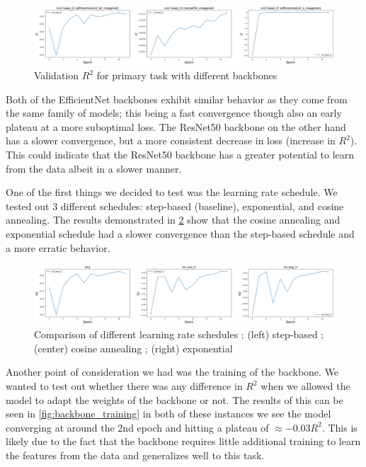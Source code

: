 \documentclass[12pt,a4paper,oneside]{article}
\begin{document}
\begin{figure}[!h]
    \centering
    \includegraphics[width=1\textwidth]{assets/different_backbones.png}
    \caption{Validation $R^2$ for primary task with different backbones}
    \label{fig:different_backbones}
\end{figure}

Both of the EfficientNet backbones exhibit similar behavior as they come from the same family of models; this being a fast convergence though also an early plateau at a more suboptimal loss. The ResNet50 backbone on the other hand has a slower convergence, but a more consistent decrease in loss (increase in $R^2$). This could indicate that the ResNet50 backbone has a greater potential to learn from the data albeit in a slower manner. 

\smallskip 
One of the first things we decided to test was the learning rate schedule. We tested out 3 different schedules: step-based (baseline), exponential, and cosine annealing. The results demonstrated in \ref{fig:lr_schedules} show that the cosine annealing and exponential schedule had a slower convergence than the step-based schedule and a more erratic behavior.  

\begin{figure}[!h]
    \centering
    \includegraphics[width=1\textwidth]{assets/lr_schedule_diffs.png}
    \caption{Comparison of different learning rate schedules ; (left) step-based ; (center) cosine annealing ; (right) exponential}
    \label{fig:lr_schedules}
\end{figure}


Another point of consideration we had was the training of the backbone. We wanted to test out whether there was any difference in $R^2$ when we allowed the model to adapt the weights of the backbone or not. The results of this can be seen in \ref{fig:backbone_training} in both of these instances we see the model converging at around the 2nd epoch and hitting a plateau of $\approx -0.03 R^2$. This is likely due to the fact that the backbone requires little additional training to learn the features from the data and generalizes well to this task.
\end{document}
